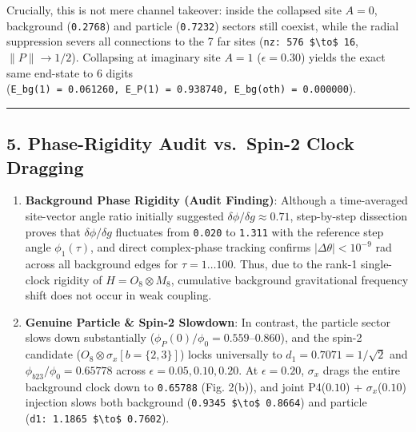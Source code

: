 \documentclass[
  a4paper,
]{article}
\providecommand{\tightlist}{%
  \setlength{\itemsep}{0pt}\setlength{\parskip}{0pt}}
\begin{document}
Crucially, this is not mere channel takeover: inside the collapsed site
\(A = 0\), background (\texttt{0.2768}) and particle (\texttt{0.7232})
sectors still coexist, while the radial suppression severs all
connections to the 7 far sites
(\texttt{nz:\ 576\ \$\textbackslash{}to\$\ 16}, \(\|P\| \to 1/2\)).
Collapsing at imaginary site \(A = 1\) (\(\epsilon = 0.30\)) yields the
exact same end-state to 6 digits
(\texttt{E\_bg(1)\ =\ 0.061260,\ E\_P(1)\ =\ 0.938740,\ E\_bg(oth)\ =\ 0.000000}).

\begin{center}\rule{0.5\linewidth}{0.5pt}\end{center}

\subsection{5. Phase-Rigidity Audit vs.~Spin-2 Clock
Dragging}\label{phase-rigidity-audit-vs.-spin-2-clock-dragging}

\begin{enumerate}
\def\labelenumi{\arabic{enumi}.}
\tightlist
\item
  \textbf{Background Phase Rigidity (Audit Finding)}: Although a
  time-averaged site-vector angle ratio initially suggested
  \(\delta\phi/\delta g \approx 0.71\), step-by-step dissection proves
  that \(\delta\phi/\delta g\) fluctuates from \texttt{0.020} to
  \texttt{1.311} with the reference step angle \(\phi_1(\tau)\), and
  direct complex-phase tracking confirms \(|\Delta\theta| < 10^{-9}\)
  rad across all background edges for \(\tau = 1 \dots 100\). Thus, due
  to the rank-1 single-clock rigidity of \(H = O_8 \otimes M_8\),
  cumulative background gravitational frequency shift does not occur in
  weak coupling.
\item
  \textbf{Genuine Particle \& Spin-2 Slowdown}: In contrast, the
  particle sector slows down substantially
  (\(\phi_P(0)/\phi_0 = 0.559\)--\(0.860\)), and the spin-2 candidate
  (\(O_8 \otimes \sigma_x[b=\{2,3\}]\)) locks universally to
  \(d_1 = 0.7071 = 1/\sqrt{2}\) and \(\phi_{b23}/\phi_0 = 0.65778\)
  across \(\epsilon = 0.05, 0.10, 0.20\). At \(\epsilon = 0.20\),
  \(\sigma_x\) drags the entire background clock down to
  \texttt{0.65788} (Fig. 2(b)), and joint P4(\(0.10\)) +
  \(\sigma_x\)(\(0.10\)) injection slows both background
  (\texttt{0.9345\ \$\textbackslash{}to\$\ 0.8664}) and particle
  (\texttt{d1:\ 1.1865\ \$\textbackslash{}to\$\ 0.7602}).
\end{enumerate}
\end{document}
